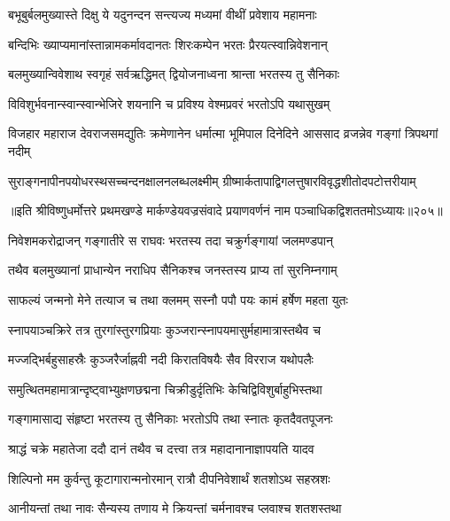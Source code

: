 \twolineshloka
{बभूबुर्बलमुख्यास्ते दिक्षु ये यदुनन्दन}
{सन्त्यज्य मध्यमां वीथीं प्रवेशाय महामनाः}%

\twolineshloka
{बन्दिभिः ख्याप्यमानांस्तान्नामकर्मावदानतः}
{शिरःकम्पेन भरतः प्रैरयत्स्वान्निवेशनान्}%

\twolineshloka
{बलमुख्यान्विवेशाथ स्वगृहं सर्वऋद्धिमत्}
{द्वियोजनाध्वना श्रान्ता भरतस्य तु सैनिकाः}%

\twolineshloka
{विविशुर्भवनान्स्वान्स्वान्भेजिरे शयनानि च}
{प्रविश्य वेश्मप्रवरं भरतोऽपि यथासुखम्}%


\threelineshloka
{विजहार महाराज देवराजसमद्युतिः}
{क्रमेणानेन धर्मात्मा भूमिपाल दिनेदिने}
{आससाद व्रजन्नेव गङ्गां त्रिपथगां नदीम्}%

\twolineshloka
{सुराङ्गनापीनपयोधरस्थसच्चन्दनक्षालनलब्धलक्ष्मीम्} 
{ग्रीष्मार्कतापाद्विगलत्तुषारविवृद्धशीतोदपटोत्तरीयाम्}%

॥इति श्रीविष्णुधर्मोत्तरे प्रथमखण्डे मार्कण्डेयवज्रसंवादे प्रयाणवर्णनं नाम पञ्चाधिकद्विशततमोऽध्यायः॥२०५॥



\twolineshloka
{निवेशमकरोद्राजन् गङ्गातीरे स राघवः}
{भरतस्य तदा चक्रुर्गङ्गायां जलमण्डपान्}%

\twolineshloka
{तथैव बलमुख्यानां प्राधान्येन नराधिप}
{सैनिकश्च जनस्तस्य प्राप्य तां सुरनिम्नगाम्}%

\twolineshloka
{साफल्यं जन्मनो मेने तत्याज च तथा क्लमम्}
{सस्नौ पपौ पयः कामं हर्षेण महता युतः}%

\twolineshloka
{स्नापयाञ्चक्रिरे तत्र तुरगांस्तुरगप्रियाः}
{कुञ्जरान्स्नापयमासुर्महामात्रास्तथैव च}%

\twolineshloka
{मज्जद्भिर्बहुसाहस्रैः कुञ्जरैर्जाह्नवी नदी}
{किरातविषयैः सैव विरराज यथोपलैः}%

\twolineshloka
{समुत्थितमहामात्रान्दृष्ट्वाभ्युक्षणछद्मना}
{चिक्रीडुर्दृतिभिः केचिद्विविशुर्बाहुभिस्तथा}%

\twolineshloka
{गङ्गामासाद्य संहृष्टा भरतस्य तु सैनिकाः}
{भरतोऽपि तथा स्नातः कृतदैवतपूजनः}%

\twolineshloka
{श्राद्धं चक्रे महातेजा ददौ दानं तथैव च}
{दत्त्वा तत्र महादानानाज्ञापयति यादव}%

\twolineshloka
{शिल्पिनो मम कुर्वन्तु कूटागारान्मनोरमान्}
{रात्रौ दीपनिवेशार्थं शतशोऽथ सहस्रशः}%

\twolineshloka
{आनीयन्तां तथा नावः सैन्यस्य तणाय मे}
{क्रियन्तां चर्मनावश्च प्लवाश्च शतशस्तथा} %

